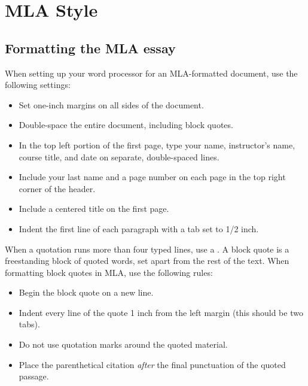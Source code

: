 

\chapter{MLA Style} 


\section{Formatting the MLA essay}
When setting up your word processor for an MLA-formatted document, use the 
following settings:

\begin{itemize}
\item Set one-inch margins on all sides of the document.
\item Double-space the entire document, including block quotes.
\item In the top left portion of the first page, type your name, instructor's name, course title, and date on separate, double-spaced lines.
\item Include your last name and a page number on each page in the top right corner of the header.
\item Include a centered title on the first page.
\item Indent the first line of each paragraph with a tab set to 1/2 inch.
\end{itemize}

\newpage



When a quotation runs more than four typed lines, use a . A block quote is a freestanding block of quoted words, set apart from the rest of the text. When formatting block quotes in MLA, use the following rules: 

\begin{itemize}
\item Begin the block quote on a new line. 
\item Indent every line of the quote 1 inch from the left margin (this should be two tabs). 
\item Do not use quotation marks around the quoted material. 
\item Place the parenthetical citation \emph{after} the final punctuation of the quoted passage.
\end{itemize}

